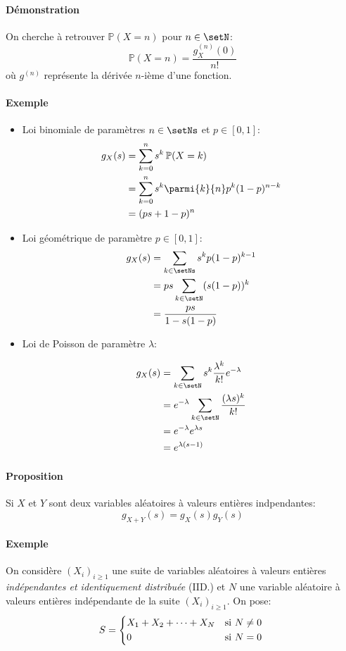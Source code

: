 \documentclass[a4paper,10pt,french,openany]{memoir}
\newcommand{\Proba}{\mathbb{P}}
\begin{document}
\paragraph{Démonstration}
On cherche à retrouver $\Proba(X=n)$ pour $n\in \setN$:
\[ \Proba(X=n)=\frac{g_X^{(n)}(0)}{n!} \]
où $g^{(n)}$ représente la dérivée $n$-ième d'une fonction.

\paragraph{Exemple}
\begin{itemize}
 \item Loi binomiale de paramètres $n\in\setNs$ et $p\in[0,1]$:
 \begin{align*}
    g_X(s) &= \sum_{k=0}^n s^k\,\Proba(X=k) \\
    &= \sum_{k=0}^n s^k\parmi{k}{n} p^k (1-p)^{n-k} \\
    &= (p s + 1 - p)^n
 \end{align*}
 \item Loi géométrique de paramètre $p\in[0,1]$:
 \begin{align*}
    g_X(s) &= \sum_{k\in\setNs} s^k p (1-p)^{k-1} \\
    &= p s \sum_{k\in\setN} (s (1-p))^k \\
    &= \frac{p s}{1 - s(1-p)}
 \end{align*}
 \item Loi de Poisson de paramètre $\lambda$:
 
 \begin{align*}
    g_X(s) &= \sum_{k\in\setN} s^k \frac{\lambda^k}{k!} e^{-\lambda} \\
    &= e^{-\lambda} \sum_{k\in\setN} \frac{(\lambda s)^k}{k!} \\
    &= e^{-\lambda} e^{\lambda s} \\
    &= e^{\lambda(s-1)}
 \end{align*}
\end{itemize}

\paragraph{Proposition}
Si $X$ et $Y$ sont deux variables aléatoires à valeurs entières indpendantes:
\[g_{X+Y}(s)=g_X(s) g_Y(s)\]

\paragraph{Exemple}
On considère $(X_i)_{i\geq 1}$ une suite de variables aléatoires à valeurs entières \emph{indépendantes et identiquement distribuée} (IID.) et $N$ une variable aléatoire à valeurs entières indépendante de la suite $(X_i)_{i\geq 1}$. On pose:
\[S=\begin{cases*}
X_1+X_2+\dots+X_N & si $N\neq0$ \\ 
0 & si $N=0$
\end{cases*}\]
\end{document}
